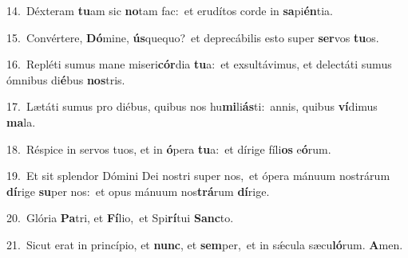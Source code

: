 {\numbfont\textcolor{\numbcolor}{14.}}~Déxteram \textbf{tu}\-am sic \textbf{no}\-tam fac:~\star et erudítos corde in \textbf{sa}\-pi\-\textbf{én}\-tia.\par
{\numbfont\textcolor{\numbcolor}{15.}}~Convértere, \textbf{Dó}\-mine, \textbf{ús}\-quequo?~\star et deprecábilis esto super \textbf{ser}\-vos \textbf{tu}\-os.\par
{\numbfont\textcolor{\numbcolor}{16.}}~Repléti sumus mane miseri\-\textbf{cór}\-dia \textbf{tu}\-a:~\star et exsultávimus, et delectáti sumus ómnibus di\-\textbf{é}\-bus \textbf{nos}\-tris.\par
{\numbfont\textcolor{\numbcolor}{17.}}~Lætáti sumus pro diébus, quibus nos hu\-\textbf{mi}\-li\-\textbf{ás}\-ti:~\star annis, quibus \textbf{ví}\-dimus \textbf{ma}\-la.\par
{\numbfont\textcolor{\numbcolor}{18.}}~Réspice in servos tuos, et in \textbf{ó}\-pera \textbf{tu}\-a:~\star et dírige fíli\textbf{os} e\-\textbf{ó}\-rum.\par
{\numbfont\textcolor{\numbcolor}{19.}}~Et sit splendor Dómini Dei nostri super nos,~\dagger et ópera mánuum nostrárum \textbf{dí}\-rige \textbf{su}\-per nos:~\star et opus mánuum nos\-\textbf{trá}\-rum \textbf{dí}\-rige.\par
{\numbfont\textcolor{\numbcolor}{20.}}~Glória \textbf{Pa}\-tri, et \textbf{Fí}\-lio,~\star et Spi\-\textbf{rí}\-tui \textbf{Sanc}\-to.\par
{\numbfont\textcolor{\numbcolor}{21.}}~Sicut erat in princípio, et \textbf{nunc}\-, et \textbf{sem}\-per,~\star et in sǽcula sæcu\-\textbf{ló}\-rum. \textbf{A}\-men.\par
